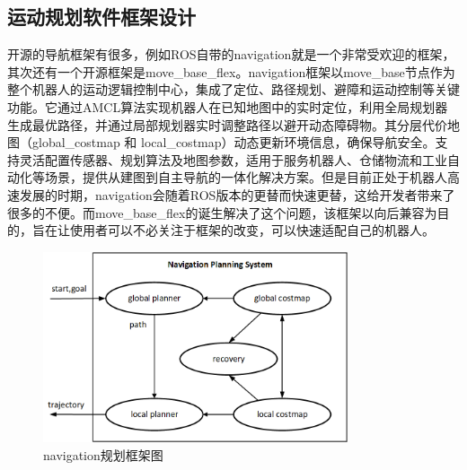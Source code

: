 \documentclass[master,academic]{ysuthesis} %
\begin{document}
	\subsection{运动规划软件框架设计}
	开源的导航框架有很多，例如ROS自带的navigation就是一个非常受欢迎的框架，其次还有一个开源框架是move\_base\_flex。navigation框架以move\_base节点作为整个机器人的运动逻辑控制中心，集成了定位、路径规划、避障和运动控制等关键功能。它通过​AMCL算法实现机器人在已知地图中的实时定位，利用全局规划器生成最优路径，并通过局部规划器实时调整路径以避开动态障碍物。其分层代价地图（global\_costmap 和 local\_costmap）动态更新环境信息，确保导航安全。支持灵活配置传感器、规划算法及地图参数，适用于服务机器人、仓储物流和工业自动化等场景，提供从建图到自主导航的一体化解决方案。但是目前正处于机器人高速发展的时期，navigation会随着ROS版本的更替而快速更替，这给开发者带来了很多的不便。而move\_base\_flex的诞生解决了这个问题，该框架以向后兼容为目的，旨在让使用者可以不必关注于框架的改变，可以快速适配自己的机器人。
	\begin{figure}[!ht]
		\centering
		\includegraphics[width=0.8\textwidth]{navigation规划框架.png}
		\caption{navigation规划框架图}
		\label{fig:navigation规划框架图}
	\end{figure}
	
\end{document}
